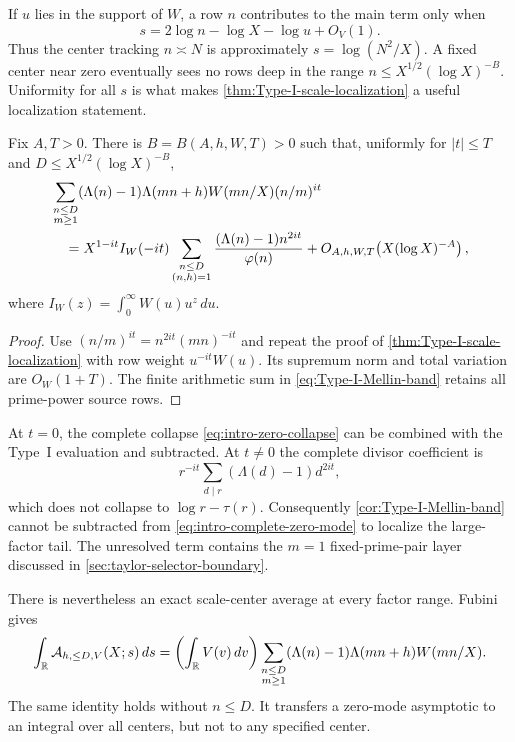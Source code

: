 \begin{remark}
\label{rem:moving-center}
If $u$ lies in the support of $W$, a row $n$ contributes to the main term
only when
\[
 s=2\log n-\log X-\log u+O_V(1).
\]
Thus the center tracking $n\asymp N$ is approximately
$s=\log(N^2/X)$.  A fixed center near zero eventually sees no rows deep in
the range $n\leq X^{1/2}(\log X)^{-B}$.  Uniformity for all $s$ is what
makes \cref{thm:Type-I-scale-localization} a useful localization statement.
\end{remark}

\begin{corollary}
\label{cor:Type-I-Mellin-band}
Fix $A,T>0$.  There is $B=B(A,h,W,T)>0$ such that, uniformly for
$|t|\leq T$ and
$D\leq X^{1/2}(\log X)^{-B}$,
\begin{align}
 &\sum_{\substack{n\leq D\\m\geq1}}
 (\Lambda(n)-1)\Lambda(mn+h)W(mn/X)(n/m)^{it}
 \notag\\
 &\quad=X^{1-it}I_W(-it)
 \sum_{\substack{n\leq D\\(n,h)=1}}
 \frac{(\Lambda(n)-1)n^{2it}}{\varphi(n)}
 +O_{A,h,W,T}\!\left(X(\log X)^{-A}\right),
 \label{eq:Type-I-Mellin-band}
\end{align}
where
\(
 I_W(z)=\int_0^\infty W(u)u^z\,du
\).
\end{corollary}

\begin{proof}
Use
$(n/m)^{it}=n^{2it}(mn)^{-it}$ and repeat the proof of
\cref{thm:Type-I-scale-localization} with row weight
$u^{-it}W(u)$.  Its supremum norm and total variation are
$O_{W}(1+T)$.  The finite arithmetic sum in
\eqref{eq:Type-I-Mellin-band} retains all prime-power source rows.
\end{proof}

\begin{remark}
At $t=0$, the complete collapse \eqref{eq:intro-zero-collapse} can be
combined with the Type~I evaluation and subtracted.  At $t\ne0$ the
complete divisor coefficient is
\[
 r^{-it}\sum_{d\mid r}(\Lambda(d)-1)d^{2it},
\]
which does not collapse to $\log r-\tau(r)$.  Consequently
\cref{cor:Type-I-Mellin-band} cannot be subtracted from
\eqref{eq:intro-complete-zero-mode} to localize the large-factor tail.
The unresolved term contains the $m=1$ fixed-prime-pair layer discussed in
\cref{sec:taylor-selector-boundary}.
\end{remark}

There is nevertheless an exact scale-center average at every factor range.
Fubini gives
\begin{equation}\label{eq:center-average-identity}
 \int_\mathbb R\mathcal A_{h,\leq D,V}(X;s)\,ds
 =\left(\int_\mathbb R V(v)\,dv\right)
 \sum_{\substack{n\leq D\\m\geq1}}
 (\Lambda(n)-1)\Lambda(mn+h)W(mn/X).
\end{equation}
The same identity holds without $n\leq D$.  It transfers a zero-mode
asymptotic to an integral over all centers, but not to any specified center.
